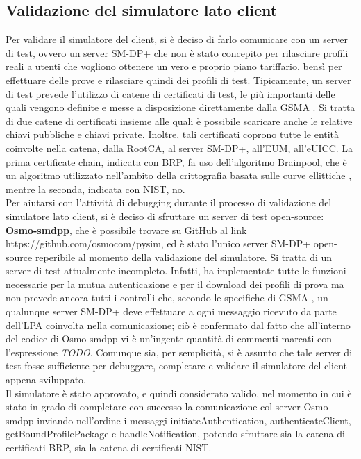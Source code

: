 \documentclass[10pt, oneside]{book}
\begin{document}
\subsection{Validazione del simulatore lato client}
Per validare il simulatore del client, si è deciso di farlo comunicare con un server di test, ovvero un server SM-DP+ che non è stato concepito per rilasciare profili reali a utenti che vogliono ottenere un vero e proprio piano tariffario, bensì per effettuare delle prove e rilasciare quindi dei profili di test. Tipicamente, un server di test prevede l'utilizzo di catene di certificati di test, le più importanti delle quali vengono definite e messe a disposizione direttamente dalla GSMA \cite{GSMA-test-cert}. Si tratta di due catene di certificati insieme alle quali è possibile scaricare anche le relative chiavi pubbliche e chiavi private. Inoltre, tali certificati coprono tutte le entità coinvolte nella catena, dalla RootCA, al server SM-DP+, all'EUM, all'eUICC. La prima certificate chain, indicata con BRP, fa uso dell'algoritmo Brainpool, che è un algoritmo utilizzato nell'ambito della crittografia basata sulle curve ellittiche \cite{RFC-5639}, mentre la seconda, indicata con NIST, no.\\
Per aiutarsi con l'attività di debugging durante il processo di validazione del simulatore lato client, si è deciso di sfruttare un server di test open-source: \textbf{Osmo-smdpp}, che è possibile trovare su GitHub al link https://github.com/osmocom/pysim, ed è stato l'unico server SM-DP+ open-source reperibile al momento della validazione del simulatore. Si tratta di un server di test attualmente incompleto. Infatti, ha implementate tutte le funzioni necessarie per la mutua autenticazione e per il download dei profili di prova ma non prevede ancora tutti i controlli che, secondo le specifiche di GSMA \cite{GSMA-docs-new}, un qualunque server SM-DP+ deve effettuare a ogni messaggio ricevuto da parte dell'LPA coinvolta nella comunicazione; ciò è confermato dal fatto che all'interno del codice di Osmo-smdpp vi è un'ingente quantità di commenti marcati con l'espressione \textit{TODO}. Comunque sia, per semplicità, si è assunto che tale server di test fosse sufficiente per debuggare, completare e validare il simulatore del client appena sviluppato.\\
Il simulatore è stato approvato, e quindi considerato valido, nel momento in cui è stato in grado di completare con successo la comunicazione col server Osmo-smdpp inviando nell'ordine i messaggi initiateAuthentication, authenticateClient, getBoundProfilePackage e handleNotification, potendo sfruttare sia la catena di certificati BRP, sia la catena di certificati NIST.
\end{document}
